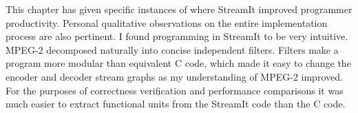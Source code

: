 This chapter has given specific instances of where StreamIt improved
programmer productivity. Personal qualitative observations on the entire
implementation process are also pertinent. I found programming in StreamIt
to be very intuitive.
MPEG-2 decomposed naturally into concise independent filters. 
Filters make a program more modular than equivalent C code, 
which made it easy to change the encoder and decoder
stream graphs as my understanding of MPEG-2 improved. For the purposes
of correctness verification and performance comparisons it was much easier
to extract functional units from the StreamIt code than the C code.

